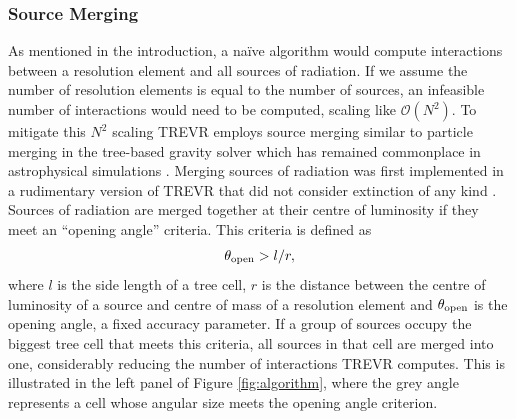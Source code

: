 \documentclass[fleq,usenatbib]{mnras}
\newcommand{\acro}{TREVR}
\newcommand{\bigO}[1]{\mathcal{O}\left(#1\right)}
\newcommand{\tO}{\theta_{\rm open}}
\begin{document}
\subsubsection{Source Merging}
As mentioned in the introduction, a na\"ive algorithm would compute 
interactions between a resolution element and  all sources of radiation. If we 
assume the number of resolution elements is equal to the number of sources, 
an infeasible number of interactions would need to be computed, scaling like 
$\bigO{N^2}$. To mitigate this $N^2$ scaling \acro{} employs source merging 
similar to particle merging in the \cite{barnesHut86} tree-based gravity 
solver which has remained commonplace in astrophysical simulations 
\citep{benz88,vineSigurdsson98,springelEt01,wadsleyEt03,hubberEt11}. Merging 
sources of radiation was first implemented in a rudimentary version of \acro{} 
that did not consider extinction of any kind \citep{kannanEt14}. Sources of 
radiation are merged together at their centre of luminosity if they meet an 
``opening angle'' criteria. This criteria is defined as 
\begin{equation}
\label{eqn:openangle}
\tO > l/r,
\end{equation}
where $l$ is the side length of a tree cell, $r$ is the distance between the 
centre of luminosity of a source and centre of mass of a resolution element 
and $\tO$ is the opening angle, a fixed accuracy parameter. If a 
group of sources occupy the biggest tree cell that meets this criteria, all 
sources in that cell are merged into one, considerably reducing the number of 
interactions \acro{} computes. This is illustrated in the left panel of Figure 
\ref{fig:algorithm}, where the grey angle represents a cell whose angular size 
meets the opening angle criterion.
\end{document}
